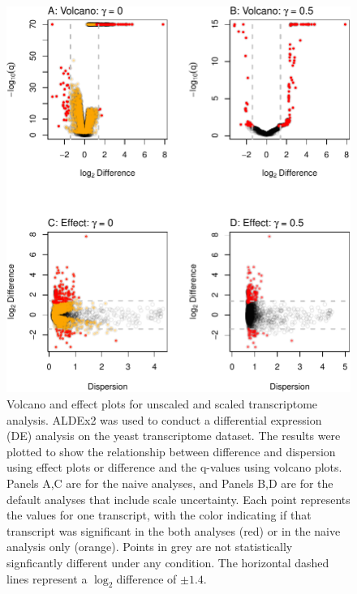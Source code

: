 \documentclass[
]{article}
\begin{document}
\begin{figure}

{\centering \includegraphics[width=0.8\linewidth]{go3_files/figure-latex/yst-plot-1} 

}

\caption{Volcano and effect plots for unscaled and scaled transcriptome analysis. ALDEx2 was used to conduct a differential expression (DE) analysis on the yeast transcriptome dataset. The results were plotted to show the relationship between difference and dispersion using effect plots or difference and the q-values using volcano plots. Panels A,C are for the naive analyses, and Panels B,D are for the  default analyses that include scale uncertainty. Each point represents the values for one transcript, with the color indicating if that transcript was significant in the both analyses (red) or in the naive analysis only (orange). Points in grey are not statistically signficantly different under any condition. The horizontal dashed lines represent a \(\log_2\)difference of \(\pm 1.4\).}\label{fig:yst-plot}
\end{figure}
\end{document}
